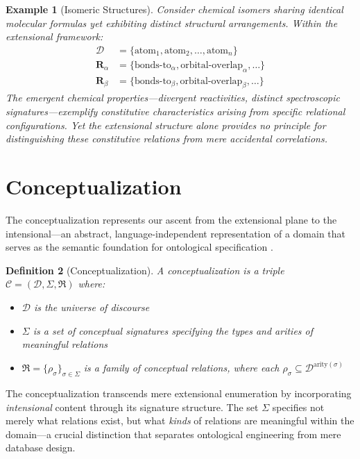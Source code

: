 \documentclass[11pt,a4paper]{article}
\newtheorem{definition}{Definition}[section]
\newtheorem{example}[definition]{Example}
\newcommand{\domain}{\mathcal{D}}
\newcommand{\concept}{\mathcal{C}}
\newcommand{\intrel}{\mathfrak{R}}
\begin{document}
\begin{example}[Isomeric Structures]
Consider chemical isomers sharing identical molecular formulas yet exhibiting distinct structural arrangements. Within the extensional framework:
\begin{align*}
    \domain &= \{\text{atom}_1, \text{atom}_2, \ldots, \text{atom}_n\}\\
    \mathbf{R}_{\alpha} &= \{\text{bonds-to}_\alpha, \text{orbital-overlap}_\alpha, \ldots\}\\
    \mathbf{R}_{\beta} &= \{\text{bonds-to}_\beta, \text{orbital-overlap}_\beta, \ldots\}
\end{align*}
The emergent chemical properties---divergent reactivities, distinct spectroscopic signatures---exemplify constitutive characteristics arising from specific relational configurations. Yet the extensional structure alone provides no principle for distinguishing these constitutive relations from mere accidental correlations.
\end{example}

\section{Conceptualization}

The conceptualization represents our ascent from the extensional plane to the intensional---an abstract, language-independent representation of a domain that serves as the semantic foundation for ontological specification \citep{gruber1995, guarino1998}.

\begin{definition}[Conceptualization]
A \emph{conceptualization} is a triple $\concept = (\domain, \Sigma, \intrel)$ where:
\begin{itemize}
    \item $\domain$ is the universe of discourse
    \item $\Sigma$ is a set of \emph{conceptual signatures} specifying the types and arities of meaningful relations
    \item $\intrel = \{\rho_\sigma\}_{\sigma \in \Sigma}$ is a family of \emph{conceptual relations}, where each $\rho_\sigma \subseteq \domain^{\text{arity}(\sigma)}$
\end{itemize}
\end{definition}

The conceptualization transcends mere extensional enumeration by incorporating \emph{intensional} content through its signature structure. The set $\Sigma$ specifies not merely what relations exist, but what \emph{kinds} of relations are meaningful within the domain---a crucial distinction that separates ontological engineering from mere database design.
\end{document}
